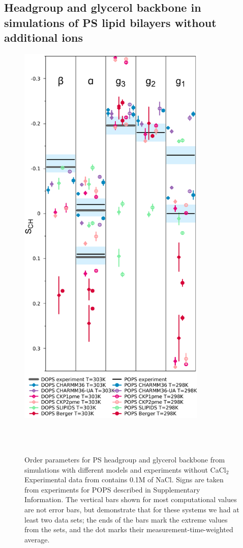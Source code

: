 \documentclass[aps,prl,superscriptaddress,twocolumn]{revtex4}
\begin{document}
\subsection{Headgroup and glycerol backbone in simulations of PS lipid bilayers without additional ions}
\begin{figure}[]
  \centering
  \includegraphics[width=9.0cm]{../Figs/HGorderparametersPS.pdf}
  \caption{\label{HGorderParametersPS}
    Order parameters for PS headgroup and glycerol
    backbone from simulations with different models and experiments without CaCl$_2$ 
    Experimental data from \cite{browning80} contains 0.1M of NaCl.
    Signs are taken from experiments for POPS described in Supplementary Information.
    The vertical bars shown for most computational values are not error bars, but demonstrate that for these systems we had at least two data sets; the ends of the bars mark the extreme values from the sets, and the dot marks their measurement-time-weighted average.
  }
   \\
   \\
\end{figure}
\end{document}
